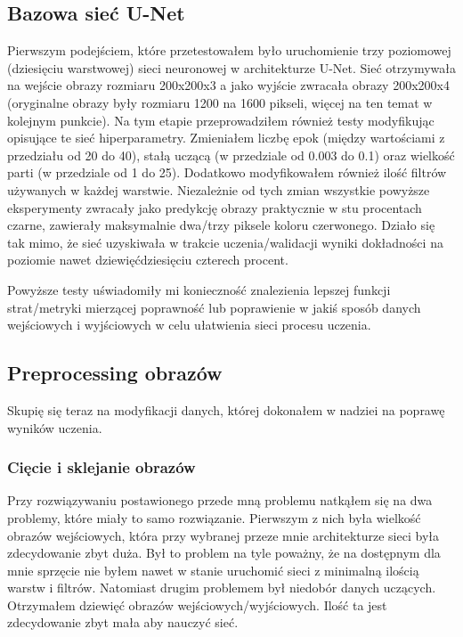 \documentclass{article}
\begin{document}
\subsection{Bazowa sieć U-Net}
Pierwszym podejściem, które przetestowałem było uruchomienie trzy poziomowej (dziesięciu warstwowej) sieci neuronowej w architekturze U-Net.
Sieć otrzymywała na wejście obrazy rozmiaru 200x200x3 a jako wyjście zwracała obrazy 200x200x4 (oryginalne obrazy były rozmiaru 1200 na 1600 pikseli, więcej na ten temat w kolejnym punkcie).
Na tym etapie przeprowadziłem również testy modyfikując opisujące te sieć hiperparametry.
Zmieniałem liczbę epok (między wartościami z przedziału od 20 do 40), stałą uczącą (w przedziale od 0.003 do 0.1) oraz wielkość parti (w przedziale od 1 do 25).
Dodatkowo modyfikowałem również ilość filtrów używanych w każdej warstwie.
Niezależnie od tych zmian wszystkie powyższe eksperymenty zwracały jako predykcję obrazy praktycznie w stu procentach czarne, zawierały maksymalnie dwa/trzy piksele koloru czerwonego.
Działo się tak mimo, że sieć uzyskiwała w trakcie uczenia/walidacji wyniki dokładności na poziomie nawet dziewięćdziesięciu czterech procent.

Powyższe testy uświadomiły mi konieczność znalezienia lepszej funkcji strat/metryki mierzącej poprawność lub poprawienie w jakiś sposób danych wejściowych i wyjściowych w celu ułatwienia sieci procesu uczenia.
\subsection{Preprocessing obrazów}
Skupię się teraz na modyfikacji danych, której dokonałem w nadziei na poprawę wyników uczenia.
\subsubsection{Cięcie i sklejanie obrazów}
Przy rozwiązywaniu postawionego przede mną problemu natkąłem się na dwa problemy, które miały to samo rozwiązanie.
Pierwszym z nich była wielkość obrazów wejściowych, która przy wybranej przeze mnie architekturze sieci była zdecydowanie zbyt duża. Był to problem na tyle poważny, że na dostępnym dla mnie sprzęcie nie byłem nawet w stanie uruchomić sieci z minimalną ilością warstw i filtrów.
Natomiast drugim problemem był niedobór danych uczących.
Otrzymałem dziewięć obrazów wejściowych/wyjściowych.
Ilość ta jest zdecydowanie zbyt mała aby nauczyć sieć.
\end{document}
